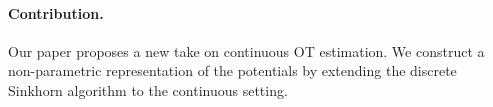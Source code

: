 \paragraph{Contribution.}

Our paper proposes a new take on continuous OT estimation. We construct a
non-parametric representation of the potentials by extending the discrete Sinkhorn algorithm to the continuous setting.



